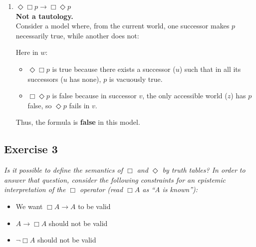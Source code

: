 \documentclass[11pt]{article}
\begin{document}
\begin{enumerate}
        \item[(d)] $\Diamond\Box p \rightarrow \Box\Diamond p$ \\[1ex]
        \textbf{Not a tautology.} \\
        Consider a model where, from the current world, one successor makes $p$ necessarily true, while another does not:
        \begin{center}
        \end{center}
        Here in $w$:
        \begin{itemize}
            \item $\Diamond\Box p$ is true because there exists a successor ($u$) such that in all its successors ($u$ has none), $p$ is vacuously true.
            \item $\Box\Diamond p$ is false because in successor $v$, the only accessible world ($z$) has $p$ false, so $\Diamond p$ fails in $v$.
        \end{itemize}
        Thus, the formula is \textbf{false} in this model.
    \end{enumerate}


    \subsection{Exercise 3}

    \textit{Is it possible to define the semantics of $\Box$ and $\Diamond$ by truth tables? In order to answer that question, consider the following constraints for an epistemic interpretation of the $\Box$ operator (read $\Box A$ as ``A is known''):}
    \begin{itemize}
        \item We want $\Box A \rightarrow A$ to be valid\\
        \item $A \rightarrow \Box A$ should not be valid\\
        \item $\neg \Box A$ should not be valid
    \end{itemize}
\end{document}
